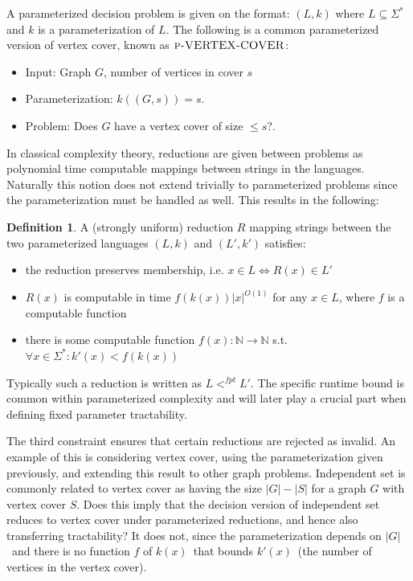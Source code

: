 \documentclass[a4paper,11pt]{report}
\theoremstyle{plain}
\theoremstyle{definition}
\newtheorem{defn}[thm]{Definition} %
\begin{document}
A parameterized decision problem is given on the format: $(L, k)$ where $L \subseteq \Sigma^*$ and $k$ is a parameterization of $L$.
The following is a common parameterized version of vertex cover, known as $\textsc{p-VERTEX-COVER}$:
\begin{itemize}
\item Input: Graph $G$, number of vertices in cover $s$
\item Parameterization: $k((G, s)) = s$.
\item Problem: Does $G$ have a vertex cover of size $\leq s$?.
\end{itemize}

In classical complexity theory, reductions are given between problems as polynomial time computable mappings between strings in the languages.
Naturally this notion does not extend trivially to parameterized problems since the parameterization must be handled as well.
This results in the following:

\begin{defn}
A (strongly uniform) reduction $R$ mapping strings between the two parameterized languages $(L, k)$ and $(L', k')$ satisfies:
\begin{itemize}
\item the reduction preserves membership, i.e. $x \in L \Leftrightarrow R(x) \in L'$
\item $R(x)$ is computable in time $f(k(x)) |x|^{O(1)}$ for any $x \in L$, where $f$ is a computable function
\item there is some computable function $f(x) : \mathbb{N} \rightarrow \mathbb{N}$ s.t. $\forall x \in \Sigma^* : k'(x) < f(k(x))$
\end{itemize}
\end{defn}

Typically such a reduction is written as $L <^{fpt} L'$.
The specific runtime bound is common within parameterized complexity and will later play a crucial part when defining fixed parameter tractability.

The third constraint ensures that certain reductions are rejected as invalid.
An example of this is considering vertex cover, using the parameterization given previously, and extending this result to other graph problems.
Independent set is commonly related to vertex cover as having the size $|G| - |S|$ for a graph $G$ with vertex cover $S$.
Does this imply that the decision version of independent set reduces to vertex cover under parameterized reductions, and hence also transferring tractability?
It does not, since the parameterization depends on $|G|$ and there is no function $f$ of $k(x)$ that bounds $k'(x)$ (the number of vertices in the vertex cover).
\end{document}
